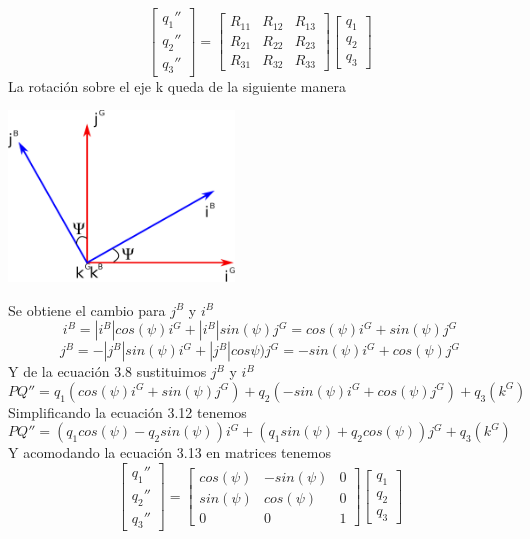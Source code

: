\begin{equation}
	\begin{bmatrix}
		q_1'' \\
		q_2'' \\
		q_3''
	\end{bmatrix}
	=
	\begin{bmatrix}
		R_{11} & R_{12} & R_{13} \\
		R_{21} & R_{22} & R_{23} \\
		R_{31} & R_{32} & R_{33}
	\end{bmatrix}
	\begin{bmatrix}
		q_1 \\
		q_2 \\
		q_3
	\end{bmatrix}
\end{equation}
La rotación sobre el eje k queda de la siguiente manera
\begin{center}
	\includegraphics[width=0.45\textwidth]{Contenido/Cuerpo/Capitulo3/Fig15.eps}
	\label{fig:ModeloMat:Fig1}
\end{center}
Se obtiene el cambio para $j^B$ y $i^B$
\begin{equation}
	i^B = |i^B|cos(\psi)i^G + |i^B|sin(\psi)j^G = cos(\psi)i^G + sin(\psi)j^G
\end{equation}
\begin{equation}
	j^B = -|j^B|sin(\psi)i^G + |j^B|cos\psi)j^G = -sin(\psi)i^G + cos(\psi)j^G
\end{equation}
Y de la ecuación 3.8 sustituimos $j^B$ y $i^B$
\begin{equation}
	PQ'' = q_1(cos(\psi)i^G + sin(\psi)j^G) + q_2(-sin(\psi)i^G + cos(\psi)j^G) + q_3(k^G)
\end{equation}
Simplificando la ecuación 3.12 tenemos
\begin{equation}
	PQ''= (q_1cos(\psi) - q_2sin(\psi))i^G + (q_1sin(\psi) + q_2cos(\psi))j^G + q_3(k^G)
\end{equation}
Y acomodando la ecuación 3.13 en matrices tenemos
\begin{equation}
	\begin{bmatrix}
		q_1'' \\
		q_2'' \\
		q_3''
	\end{bmatrix}
	=
	\begin{bmatrix}
		cos(\psi) & -sin(\psi) & 0 \\
		sin(\psi) & cos(\psi)  & 0 \\
		0         & 0          & 1
	\end{bmatrix}
	\begin{bmatrix}
		q_1 \\
		q_2 \\
		q_3
	\end{bmatrix}
\end{equation}

